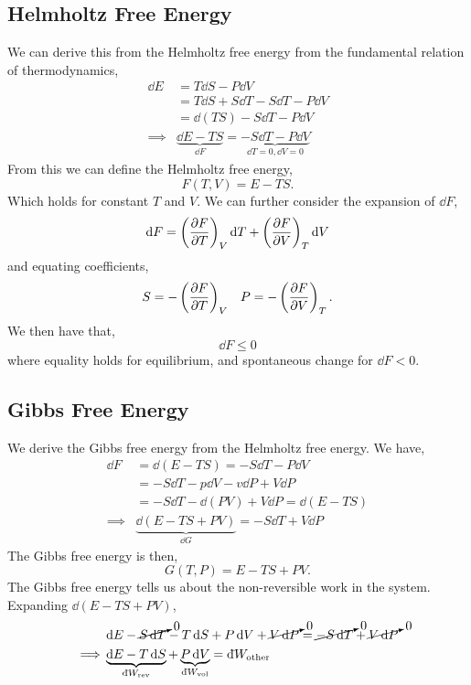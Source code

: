 \documentclass{book}
\newcommand{\dbar}{\mathrm{d}\hspace*{-0.08em}\bar{}\hspace*{0.1em}}
\begin{document}
\subsection{Helmholtz Free Energy}
We can derive this from the Helmholtz free energy from the fundamental relation of thermodynamics,
\begin{equation}
	\begin{split}
		\dd{E} & = T\dd{S} - P\dd{V} \\
		& = T\dd{S} + S\dd{T} - S\dd{T} - P\dd{V} \\
		& = \dd{(TS)} - S\dd{T} - P\dd{V} \\
		\implies & \underbrace{\dd{E - TS}}_{\dd{F}} = \underbrace{- S \dd{T} - P \dd{V}}_{\dd{T} = 0, \dd{V} = 0}
	\end{split}
\end{equation}
From this we can define the Helmholtz free energy,
\begin{equation}
	\boxed{F(T,V) = E - TS}.
\end{equation}
Which holds for constant $T$ and $V$. We can further consider the expansion of $\dd{F}$,
\begin{equation}
	\dd{F} = \left(\pdv{F}{T}\right)_V \dd{T} + \left(\pdv{F}{V}\right)_T \dd{V}
\end{equation}
and equating coefficients,
\begin{align}
	S = -\left(\pdv{F}{T}\right)_V && P = -\left(\pdv{F}{V}\right)_T.
\end{align}
We then have that,
\begin{equation}
	\dd{F} \leq 0
\end{equation}
where equality holds for equilibrium, and spontaneous change for $\dd{F} < 0$.
\subsection{Gibbs Free Energy}
We derive the Gibbs free energy from the Helmholtz free energy. We have,
\begin{equation}
	\begin{split}
		\dd{F} & = \dd{(E - TS)} = -S\dd{T} - P \dd{V} \\
		& = -S\dd{T} - p\dd{V} -v\dd{P} + V\dd{P} \\
		& = -S\dd{T} - \dd{(PV)} + V\dd{P} = \dd{(E - TS)} \\
		\implies & \underbrace{\dd{(E - TS + PV)}}_{\dd{G}} = -S\dd{T} + V\dd{P}
	\end{split}
\end{equation}
The Gibbs free energy is then,
\begin{equation}
	\boxed{G(T,P) = E - TS + PV}.
\end{equation}
The Gibbs free energy tells us about the non-reversible work in the system. Expanding $\dd{(E - TS + PV)}$, 
\begin{equation}
	\begin{split}
	& \dd{E} - \cancelto{0}{S\dd{T}} - T\dd{S} + P\dd{V} + \cancelto{0}{V\dd{P}} = \cancelto{0}{-S\dd{T}} + \cancelto{0}{V \dd{P}} \\
	\implies & \underbrace{\dd{E} - T\dd{S}}_{\dbar W_{\text{rev}}} + \underbrace{P\dd{V}}_{\dbar W_{\text{vol}}} = \dbar W_{\text{other}}
	\end{split}
\end{equation}
\end{document}
